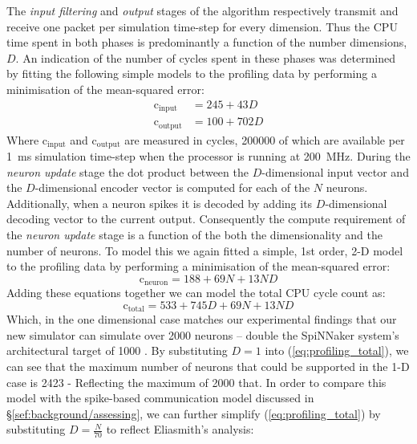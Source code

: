 \documentclass[conference]{IEEEtran}
\begin{document}
The \textit{input filtering} and \textit{output} stages of the algorithm respectively transmit and receive one packet per simulation time-step for every dimension.
Thus the CPU time spent in both phases is predominantly a function of the number dimensions, $D$.
An indication of the number of cycles spent in these phases was determined by fitting the following simple models to the profiling data by performing a minimisation of the mean-squared error:
%
\begin{align}
  \mathrm{c}_\mathrm{input} & = 245 + 43 D \label{eq:profiling_input}\\
  \mathrm{c}_\mathrm{output} & = 100 + 702 D \label{eq:profiling_output}
\end{align}
%
Where $\mathrm{c}_\mathrm{input}$ and $\mathrm{c}_\mathrm{output}$ are measured in cycles, \num{200000} of which are available per \SI{1}{\milli\second} simulation time-step when the processor is running at \SI{200}{\mega\hertz}.
During the \textit{neuron update} stage the dot product between the $D$-dimensional input vector and the $D$-dimensional encoder vector is computed for each of the $N$ neurons.
Additionally, when a neuron spikes it is decoded by adding its $D$-dimensional decoding vector to the current output.
Consequently the compute requirement of the \textit{neuron update} stage is a function of the both the dimensionality and the number of neurons.
To model this we again fitted a simple, 1st order, 2-D model to the profiling data by performing a minimisation of the mean-squared error:
%
\begin{equation}
  \mathrm{c}_\mathrm{neuron} = 188 + 69 N + 13 N D\label{eq:profiling_neuron}
\end{equation}
%
Adding these equations together we can model the total CPU cycle count as:
%
\begin{equation}
  \mathrm{c}_\mathrm{total} = 533 + 745 D + 69 N + 13 N D\label{eq:profiling_total}
\end{equation}
%
Which, in the one dimensional case matches our experimental findings that our new simulator can simulate over 2000 neurons -- double the SpiNNaker system's architectural target of 1000 \parencite{}. 
By substituting $D=1$ into (\ref{eq:profiling_total}), we can see that the maximum number of neurons that could be supported in the 1-D case is 2423 - Reflecting the maximum of 2000 that. 
In order to compare this model with the spike-based communication model discussed in \S\ref{sef:background/assessing}, we can further simplify (\ref{eq:profiling_total}) by substituting $D=\frac{N}{70}$ to reflect Eliasmith's \parencite{eliasmith2013build} analysis:
\end{document}
